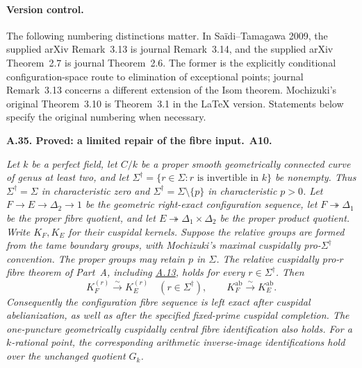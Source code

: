 \documentclass[11pt,a4paper]{article}
\newenvironment{claim}[3]{\par\medskip\noindent\hypertarget{#1}{\textbf{#1. #2.}}\ \textbf{#3.}\par\nopagebreak\smallskip\begingroup\itshape}{\endgroup\par\smallskip}
\newcommand{\statementref}[1]{\hyperlink{#1}{#1}}
\begin{document}
\paragraph{Version control.}
The following numbering distinctions matter. In Sa\"idi--Tamagawa 2009,
the supplied arXiv Remark~3.13 is journal Remark~3.14, and the supplied
arXiv Theorem~2.7 is journal Theorem~2.6. The former is the explicitly
conditional configuration-space route to elimination of exceptional
points; journal Remark~3.13 concerns a different extension of the Isom
theorem. Mochizuki's original Theorem~3.10 is Theorem~3.1 in the LaTeX
version. Statements below specify the original numbering when necessary.
\citep{LA_ST2009,LA_Mochizuki2007}

\begin{claim}{A.35}{Proved: a limited repair of the fibre input}{A10}
Let $k$ be a perfect field, let $C/k$ be a proper smooth
geometrically connected curve of genus at least two, and let
$\Sigma^\dagger=\{r\in\Sigma:r\text{ is invertible in }k\}$
be nonempty. Thus $\Sigma^\dagger=\Sigma$ in characteristic
zero and $\Sigma^\dagger=\Sigma\setminus\{p\}$ in
characteristic $p>0$.
Let $F\to E\to\Delta_2\to1$ be the geometric right-exact configuration
sequence, let $F\twoheadrightarrow\Delta_1$ be the proper fibre quotient,
and let $E\twoheadrightarrow\Delta_1\times\Delta_2$ be the proper product
quotient. Write $K_F,K_E$ for their cuspidal kernels. Suppose the relative
groups are formed from the \emph{tame} boundary groups, with Mochizuki's
maximal cuspidally pro-$\Sigma^\dagger$ convention. The proper groups
may retain $p$ in $\Sigma$. The relative cuspidally pro-$r$ fibre
theorem of Part~A, including \statementref{A.13}, holds for every
$r\in\Sigma^\dagger$.
Then
\[
 K_F^{(r)}\xrightarrow{\sim}K_E^{(r)}\quad(r\in\Sigma^\dagger),
 \qquad K_F^{\mathrm{ab}}\xrightarrow{\sim}K_E^{\mathrm{ab}}.
\]
Consequently the configuration fibre sequence is left exact after
cuspidal abelianization, as well as after the specified fixed-prime
cuspidal completion. The one-puncture geometrically cuspidally central
fibre identification also holds. For a $k$-rational point, the
corresponding arithmetic inverse-image identifications hold over
the unchanged quotient $G_k$.
\end{claim}
\end{document}
